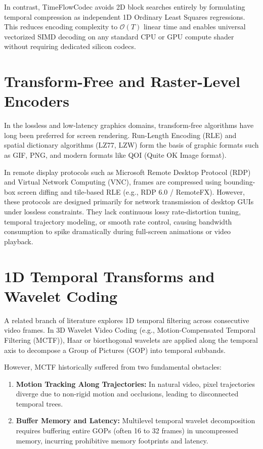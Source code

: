 In contrast, TimeFlowCodec avoids 2D block searches entirely by formulating temporal compression as independent 1D Ordinary Least Squares regressions. This reduces encoding complexity to $\mathcal{O}(T)$ linear time and enables universal vectorized SIMD decoding on any standard CPU or GPU compute shader without requiring dedicated silicon codecs.

\section{Transform-Free and Raster-Level Encoders}
In the lossless and low-latency graphics domains, transform-free algorithms have long been preferred for screen rendering. Run-Length Encoding (RLE) and spatial dictionary algorithms (LZ77, LZW) form the basis of graphic formats such as GIF, PNG, and modern formats like QOI (Quite OK Image format). 

In remote display protocols such as Microsoft Remote Desktop Protocol (RDP) and Virtual Network Computing (VNC), frames are compressed using bounding-box screen diffing and tile-based RLE (e.g., RDP 6.0 / RemoteFX). However, these protocols are designed primarily for network transmission of desktop GUIs under lossless constraints. They lack continuous lossy rate-distortion tuning, temporal trajectory modeling, or smooth rate control, causing bandwidth consumption to spike dramatically during full-screen animations or video playback.

\section{1D Temporal Transforms and Wavelet Coding}
A related branch of literature explores 1D temporal filtering across consecutive video frames. In 3D Wavelet Video Coding (e.g., Motion-Compensated Temporal Filtering (MCTF)), Haar or biorthogonal wavelets are applied along the temporal axis to decompose a Group of Pictures (GOP) into temporal subbands. 

However, MCTF historically suffered from two fundamental obstacles:
\begin{enumerate}
    \item \textbf{Motion Tracking Along Trajectories:} In natural video, pixel trajectories diverge due to non-rigid motion and occlusions, leading to disconnected temporal trees.
    \item \textbf{Buffer Memory and Latency:} Multilevel temporal wavelet decomposition requires buffering entire GOPs (often 16 to 32 frames) in uncompressed memory, incurring prohibitive memory footprints and latency.
\end{enumerate}

